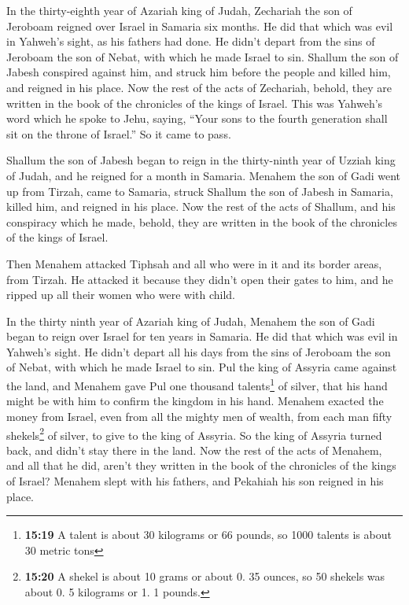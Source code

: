  In the thirty-eighth year of Azariah king of Judah,
Zechariah the son of Jeroboam reigned over Israel in Samaria six months.
 He did that which was evil in Yahweh's sight, as his
fathers had done. He didn't depart from the sins of Jeroboam the son of
Nebat, with which he made Israel to sin.  Shallum the son
of Jabesh conspired against him, and struck him before the people and
killed him, and reigned in his place.  Now the rest of
the acts of Zechariah, behold, they are written in the book of the
chronicles of the kings of Israel.  This was Yahweh's
word which he spoke to Jehu, saying, ``Your sons to the fourth
generation shall sit on the throne of Israel.'' So it came to pass.

 Shallum the son of Jabesh began to reign in the
thirty-ninth year of Uzziah king of Judah, and he reigned for a month in
Samaria.  Menahem the son of Gadi went up from Tirzah,
came to Samaria, struck Shallum the son of Jabesh in Samaria, killed
him, and reigned in his place.  Now the rest of the acts
of Shallum, and his conspiracy which he made, behold, they are written
in the book of the chronicles of the kings of Israel.

 Then Menahem attacked Tiphsah and all who were in it and
its border areas, from Tirzah. He attacked it because they didn't open
their gates to him, and he ripped up all their women who were with
child.

 In the thirty ninth year of Azariah king of Judah,
Menahem the son of Gadi began to reign over Israel for ten years in
Samaria.  He did that which was evil in Yahweh's sight.
He didn't depart all his days from the sins of Jeroboam the son of
Nebat, with which he made Israel to sin.  Pul the king of
Assyria came against the land, and Menahem gave Pul one thousand
talents\footnote{\textbf{15:19} A talent is about 30 kilograms or 66
  pounds, so 1000 talents is about 30 metric tons} of silver, that his
hand might be with him to confirm the kingdom in his hand.
 Menahem exacted the money from Israel, even from all the
mighty men of wealth, from each man fifty shekels\footnote{\textbf{15:20}
  A shekel is about 10 grams or about 0. 35 ounces, so 50 shekels was
  about 0. 5 kilograms or 1. 1 pounds.} of silver, to give to the king
of Assyria. So the king of Assyria turned back, and didn't stay there in
the land.  Now the rest of the acts of Menahem, and all
that he did, aren't they written in the book of the chronicles of the
kings of Israel?  Menahem slept with his fathers, and
Pekahiah his son reigned in his place.

